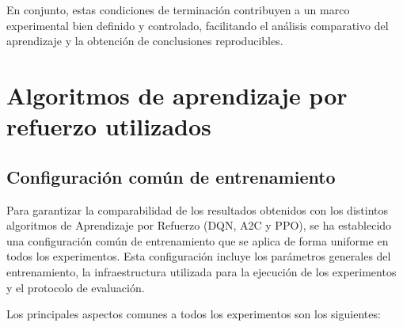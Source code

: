 En conjunto, estas condiciones de terminación contribuyen a un marco experimental bien definido y controlado, facilitando el análisis comparativo del aprendizaje y la obtención de conclusiones reproducibles.

\section{Algoritmos de aprendizaje por refuerzo utilizados}

\subsection{Configuración común de entrenamiento}

Para garantizar la comparabilidad de los resultados obtenidos con los distintos algoritmos de Aprendizaje por Refuerzo (DQN, A2C y PPO), se ha establecido una configuración común de entrenamiento que se aplica de forma uniforme en todos los experimentos. Esta configuración incluye los parámetros generales del entrenamiento, la infraestructura utilizada para la ejecución de los experimentos y el protocolo de evaluación.

Los principales aspectos comunes a todos los experimentos son los siguientes:

